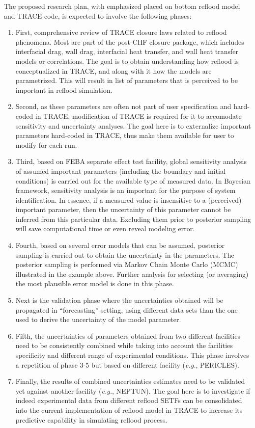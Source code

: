 \documentclass[11pt,titlepage]{article}
\begin{document}
The proposed research plan, with emphasized placed on bottom reflood model and TRACE code, is expected to involve the following phases:
\begin{enumerate}
    \item First, comprehensive review of TRACE closure laws related to reflood phenomena. Most are part of the post-CHF closure package, which includes interfacial drag, wall drag, interfacial heat transfer, and wall heat transfer models or correlations. The goal is to obtain understanding how reflood is conceptualized in TRACE, and along with it how the models are parametrized. This will result in list of parameters that is perceived to be important in reflood simulation.
    \item Second, as these parameters are often not part of user specification and hard-coded in TRACE, modification of TRACE is required for it to accomodate sensitivity and uncertainty analyses. The goal here is to externalize important parameters hard-coded in TRACE, thus make them available for user to modify for each run.  
    \item Third, based on FEBA separate effect test facility, global sensitivity analysis of assumed important parameters (including the boundary and initial conditions) is carried out for the available type of measured data. In Bayesian framework, sensitivity analysis is an important for the purpose of system identification. In essence, if a measured value is insensitive to a (perceived) important parameter, then the uncertainty of this parameter cannot be inferred from this particular data. Excluding them prior to posterior sampling will save computational time or even reveal modeling error.
    \item Fourth, based on several error models that can be assumed, posterior sampling is carried out to obtain the uncertainty in the parameters. The posterior sampling is performed via Markov Chain Monte Carlo (MCMC) illustrated in the example above. Further analysis for selecting (or averaging) the most plausible error model is done in this phase.
    \item Next is the validation phase where the uncertainties obtained will be propagated in ``forecasting'' setting, using different data sets than the one used to derive the uncertainty of the model parameter. 
    \item Fifth, the uncertainties of parameters obtained from two different facilities  need to be consistently combined while taking into account the facilities specificity and different range of experimental conditions. This phase involves a repetition of phase 3-5 but based on different facility (\textit{e.g.}, PERICLES). 
    \item Finally, the results of combined uncertainties estimates need to be validated yet against another facility (\textit{e.g.}, NEPTUN). The goal here is to investigate if indeed experimental data from different reflood SETFs can be consolidated into the current implementation of reflood model in TRACE to increase its predictive capability in simulating reflood process.
\end{enumerate}
\end{document}
